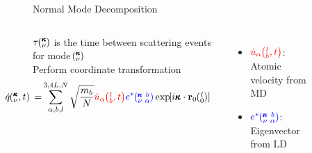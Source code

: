 \documentclass{beamer}
\newcommand{\EXP}[1]{\exp\mspace{-5.0mu}\left[#1\right]\mspace{-3.0mu}}
\newcommand{\lO}{\mspace{-4.0mu}\left(\mspace{-8.0mu}
\begin{smallmatrix}&l \\&0\end{smallmatrix}
\mspace{-3.0mu}\right)}
\newcommand{\kvba}{\mspace{-4.0mu}\left(\mspace{-8.0mu}
\begin{smallmatrix} &\pmb{\kappa} &b \\ &\nu &\alpha\end{smallmatrix}
\mspace{-3.0mu}\right)}
\newcommand{\kvt}{\mspace{-4.0mu}\left(\mspace{-8.0mu}
\begin{smallmatrix}&\pmb{\kappa} \\&\nu\end{smallmatrix}
\mspace{-2.0mu},t\right)}
\newcommand{\kv}{\mspace{-4.0mu}\left(\mspace{-8.0mu}
\begin{smallmatrix}&\pmb{\kappa} \\&\nu\end{smallmatrix}
\mspace{-3.0mu}\right)}
\newcommand{\lbt}{\mspace{-4.0mu}\left(\mspace{-8.0mu}
\begin{smallmatrix}&l \\&b\end{smallmatrix}\mspace{-2.0mu},t\right)}
\begin{document}
\begin{frame}{Normal Mode Decomposition}
\hspace*{-1cm}
\begin{columns}
${\tau\kv}$ is the time between scattering events for mode $\kv$\\
\vspace*{1cm}
Perform coordinate transformation
\begin{equation}\label{EQ:NMD:qdot}
\begin{split}
\hspace*{-1cm}\dot{q}\kvt{}{}{}=&\sum_{\alpha, b, l}^{3,4L,N}\sqrt{\frac{m_b}{N}}\textcolor{red}{\dot{u}_{\alpha}\lbt}\textcolor{blue}{e^*\kvba}\EXP{i\pmb{\kappa}\cdot\mathbf{r}_0\lO}
\end{split}
\end{equation}
\hspace*{-1cm}\begin{itemize}
\item $\textcolor{red}{\dot{u}_{\alpha}\lbt}$: Atomic velocity from MD
\item $\textcolor{blue}{e^*\kvba}$: Eigenvector from LD
\end{itemize}
\begin{figure}[t]
\begin{center}
\hspace*{-1cm}
\vspace*{-1cm}
\renewcommand{\figure}{Fig.}
\label{fig:bulk_dis_dos}
\end{center}
\end{figure}
\end{columns}
\end{frame}
\end{document}
